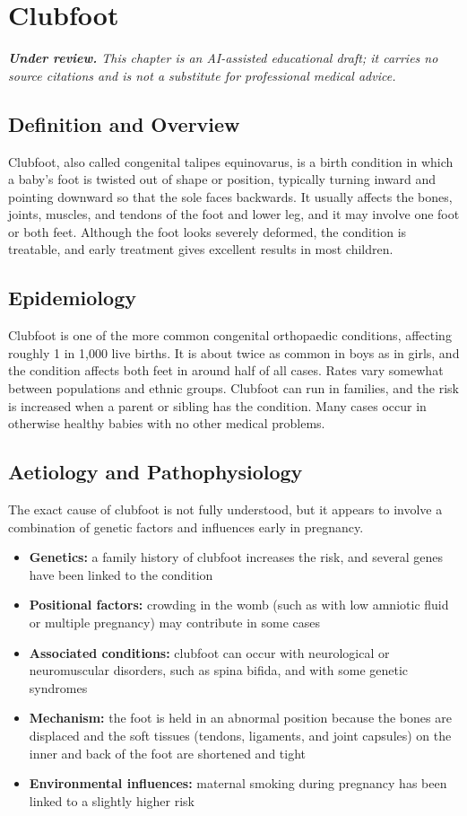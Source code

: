 \chapter{Clubfoot}

\medskip
\noindent\textit{\textbf{Under review.} This chapter is an AI-assisted educational draft; it carries no source citations and is not a substitute for professional medical advice.}

\section*{Definition and Overview}
Clubfoot, also called congenital talipes equinovarus, is a birth condition in which a baby's foot is twisted out of shape or position, typically turning inward and pointing downward so that the sole faces backwards. It usually affects the bones, joints, muscles, and tendons of the foot and lower leg, and it may involve one foot or both feet. Although the foot looks severely deformed, the condition is treatable, and early treatment gives excellent results in most children.

\section*{Epidemiology}
Clubfoot is one of the more common congenital orthopaedic conditions, affecting roughly 1 in 1,000 live births. It is about twice as common in boys as in girls, and the condition affects both feet in around half of all cases. Rates vary somewhat between populations and ethnic groups. Clubfoot can run in families, and the risk is increased when a parent or sibling has the condition. Many cases occur in otherwise healthy babies with no other medical problems.

\section*{Aetiology and Pathophysiology}
The exact cause of clubfoot is not fully understood, but it appears to involve a combination of genetic factors and influences early in pregnancy.
\begin{itemize}
    \item \textbf{Genetics:} a family history of clubfoot increases the risk, and several genes have been linked to the condition
    \item \textbf{Positional factors:} crowding in the womb (such as with low amniotic fluid or multiple pregnancy) may contribute in some cases
    \item \textbf{Associated conditions:} clubfoot can occur with neurological or neuromuscular disorders, such as spina bifida, and with some genetic syndromes
    \item \textbf{Mechanism:} the foot is held in an abnormal position because the bones are displaced and the soft tissues (tendons, ligaments, and joint capsules) on the inner and back of the foot are shortened and tight
    \item \textbf{Environmental influences:} maternal smoking during pregnancy has been linked to a slightly higher risk
\end{itemize}

